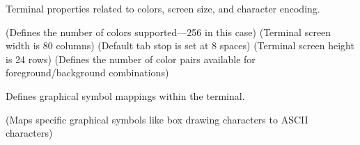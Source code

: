 \begin{NxSSBox}
	\begin{NxIDBox}
		Terminal properties related to colors, screen size, and character encoding.
		\begin{NxListDark}
			 (Defines the number of colors supported—256 in this case)
			 (Terminal screen width is 80 columns)
			 (Default tab stop is set at 8 spaces)
			 (Terminal screen height is 24 rows)
			 (Defines the number of color pairs available for foreground/background combinations)
		\end{NxListDark}
	\end{NxIDBox}
\end{NxSSBox}

\begin{NxSSBox}
	\begin{NxIDBox}
		Defines graphical symbol mappings within the terminal.
		\begin{NxListDark}
			 (Maps specific graphical symbols like box drawing characters to ASCII characters)
		\end{NxListDark}
	\end{NxIDBox}
\end{NxSSBox}

